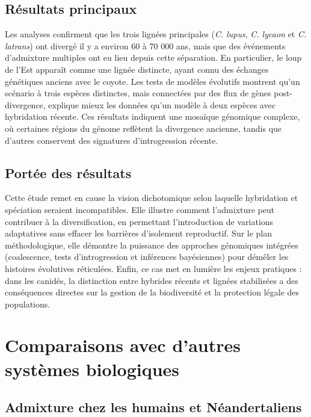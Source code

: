 \documentclass[12pt,a4paper]{article}
\begin{document}
\subsection{Résultats principaux}

Les analyses confirment que les trois lignées principales (\textit{C. lupus}, \textit{C. lycaon} et \textit{C. latrans}) ont divergé il y a environ 60 à 70 000 ans, mais que des événements d’admixture multiples ont eu lieu depuis cette séparation.
En particulier, le loup de l’Est apparaît comme une lignée distincte, ayant connu des échanges génétiques anciens avec le coyote.
Les tests de modèles évolutifs montrent qu’un scénario à trois espèces distinctes, mais connectées par des flux de gènes post-divergence, explique mieux les données qu’un modèle à deux espèces avec hybridation récente.
Ces résultats indiquent une mosaïque génomique complexe, où certaines régions du génome reflètent la divergence ancienne, tandis que d’autres conservent des signatures d’introgression récente.

\subsection{Portée des résultats}

Cette étude remet en cause la vision dichotomique selon laquelle hybridation et spéciation seraient incompatibles.
Elle illustre comment l’admixture peut contribuer à la diversification, en permettant l’introduction de variations adaptatives sans effacer les barrières d’isolement reproductif.
Sur le plan méthodologique, elle démontre la puissance des approches génomiques intégrées (coalescence, tests d’introgression et inférences bayésiennes) pour démêler les histoires évolutives réticulées.
Enfin, ce cas met en lumière les enjeux pratiques : dans les canidés, la distinction entre hybrides récents et lignées stabilisées a des conséquences directes sur la gestion de la biodiversité et la protection légale des populations.



\section{Comparaisons avec d’autres systèmes biologiques}
\subsection{Admixture chez les humains et Néandertaliens}
\end{document}
